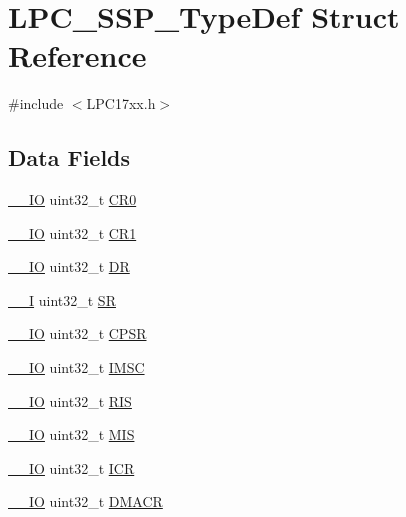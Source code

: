 \hypertarget{structLPC__SSP__TypeDef}{}\section{L\+P\+C\+\_\+\+S\+S\+P\+\_\+\+Type\+Def Struct Reference}
\label{structLPC__SSP__TypeDef}


{\ttfamily \#include $<$L\+P\+C17xx.\+h$>$}

\subsection*{Data Fields}
\begin{DoxyCompactItemize}
\item 
\hyperlink{LPC17xx_8h_aec43007d9998a0a0e01faede4133d6be}{\+\_\+\+\_\+\+IO} uint32\+\_\+t \hyperlink{structLPC__SSP__TypeDef_a32a68722d4e2c1b7dfc787c779a380a3}{C\+R0}
\item 
\hyperlink{LPC17xx_8h_aec43007d9998a0a0e01faede4133d6be}{\+\_\+\+\_\+\+IO} uint32\+\_\+t \hyperlink{structLPC__SSP__TypeDef_a016ea63a8c118f5b75a64a6e5f81c984}{C\+R1}
\item 
\hyperlink{LPC17xx_8h_aec43007d9998a0a0e01faede4133d6be}{\+\_\+\+\_\+\+IO} uint32\+\_\+t \hyperlink{structLPC__SSP__TypeDef_a305381985bf14d72c35b97ac3b56661e}{DR}
\item 
\hyperlink{LPC17xx_8h_af63697ed9952cc71e1225efe205f6cd3}{\+\_\+\+\_\+I} uint32\+\_\+t \hyperlink{structLPC__SSP__TypeDef_a82edd1e82e00dbdc9db58e5173893d77}{SR}
\item 
\hyperlink{LPC17xx_8h_aec43007d9998a0a0e01faede4133d6be}{\+\_\+\+\_\+\+IO} uint32\+\_\+t \hyperlink{structLPC__SSP__TypeDef_a454a4d1a09ccb43c3f3a8965a8b30087}{C\+P\+SR}
\item 
\hyperlink{LPC17xx_8h_aec43007d9998a0a0e01faede4133d6be}{\+\_\+\+\_\+\+IO} uint32\+\_\+t \hyperlink{structLPC__SSP__TypeDef_a61842512c283fb1c980ec6f04927a62c}{I\+M\+SC}
\item 
\hyperlink{LPC17xx_8h_aec43007d9998a0a0e01faede4133d6be}{\+\_\+\+\_\+\+IO} uint32\+\_\+t \hyperlink{structLPC__SSP__TypeDef_ac864a0884f6871821318720c8a7c06ef}{R\+IS}
\item 
\hyperlink{LPC17xx_8h_aec43007d9998a0a0e01faede4133d6be}{\+\_\+\+\_\+\+IO} uint32\+\_\+t \hyperlink{structLPC__SSP__TypeDef_a47daa783e72e341ffa762b8f89d32a74}{M\+IS}
\item 
\hyperlink{LPC17xx_8h_aec43007d9998a0a0e01faede4133d6be}{\+\_\+\+\_\+\+IO} uint32\+\_\+t \hyperlink{structLPC__SSP__TypeDef_afd52865baab6eb928d86d2f79293df2d}{I\+CR}
\item 
\hyperlink{LPC17xx_8h_aec43007d9998a0a0e01faede4133d6be}{\+\_\+\+\_\+\+IO} uint32\+\_\+t \hyperlink{structLPC__SSP__TypeDef_a94233394a593bf8de9a8497bf37cbc3c}{D\+M\+A\+CR}
\end{DoxyCompactItemize}


